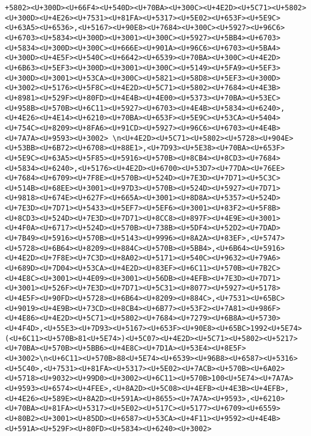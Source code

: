 \documentclass[
]{article}
\begin{document}
\begin{verbatim}
+5802><U+300D><U+66F4><U+540D><U+70BA><U+300C><U+4E2D><U+5C71><U+5802><U+300D><U+4E26><U+7531><U+81FA><U+5317><U+5E02><U+653F><U+5E9C><U+63A5><U+6536>,<U+5167><U+90E8><U+7684><U+300C><U+5927><U+96C6><U+6703><U+5834><U+300D><U+3001><U+300C><U+5927><U+5BB4><U+6703><U+5834><U+300D><U+300C><U+666E><U+901A><U+96C6><U+6703><U+5BA4><U+300D><U+4E5F><U+540C><U+6642><U+6539><U+70BA><U+300C><U+4E2D><U+6B63><U+5EF3><U+300D><U+3001><U+300C><U+5149><U+5FA9><U+5EF3><U+300D><U+3001><U+53CA><U+300C><U+5821><U+58D8><U+5EF3><U+300D><U+3002><U+5176><U+5F8C><U+4E2D><U+5C71><U+5802><U+7684><U+4E3B><U+8981><U+529F><U+80FD><U+4E4B><U+4E00><U+5373><U+70BA><U+53EC><U+958B><U+570B><U+6C11><U+5927><U+6703><U+4E4B><U+5834><U+6240>,<U+4E26><U+4E14><U+6210><U+70BA><U+653F><U+5E9C><U+53CA><U+5404><U+754C><U+8209><U+8FA6><U+91CD><U+5927><U+96C6><U+6703><U+4E4B><U+7A7A><U+9593><U+3002> \n<U+4E2D><U+5C71><U+5802><U+5728><U+904E><U+53BB><U+6B72><U+6708><U+88E1>,<U+7D93><U+5E38><U+70BA><U+653F><U+5E9C><U+63A5><U+5F85><U+5916><U+570B><U+8CB4><U+8CD3><U+7684><U+5834><U+6240>,<U+5176><U+4E2D><U+6700><U+53D7><U+77DA><U+76EE><U+7684><U+6709><U+7F8E><U+570B><U+524D><U+7E3D><U+7D71><U+5C3C><U+514B><U+68EE><U+3001><U+97D3><U+570B><U+524D><U+5927><U+7D71><U+9818><U+674E><U+627F><U+665A><U+3001><U+8D8A><U+5357><U+524D><U+7E3D><U+7D71><U+5433><U+5EF7><U+5EF6><U+3001><U+83F2><U+5F8B><U+8CD3><U+524D><U+7E3D><U+7D71><U+8CC8><U+897F><U+4E9E><U+3001><U+4F0A><U+6717><U+524D><U+570B><U+738B><U+5DF4><U+52D2><U+7DAD><U+7B49><U+5916><U+570B><U+5143><U+9996><U+8A2A><U+83EF>,<U+5747><U+5728><U+6B64><U+8209><U+884C><U+570B><U+5BB4>,<U+6B64><U+5916><U+4E2D><U+7F8E><U+7C3D><U+8A02><U+5171><U+540C><U+9632><U+79A6><U+689D><U+7D04><U+53CA><U+4E2D><U+83EF><U+6C11><U+570B><U+7B2C><U+4E8C><U+3001><U+4E09><U+3001><U+56DB><U+4EFB><U+7E3D><U+7D71><U+3001><U+526F><U+7E3D><U+7D71><U+5C31><U+8077><U+5927><U+5178><U+4E5F><U+90FD><U+5728><U+6B64><U+8209><U+884C>,<U+7531><U+65BC><U+9019><U+4E9B><U+73CD><U+8CB4><U+6B77><U+53F2><U+7A81><U+986F><U+4E86><U+4E2D><U+5C71><U+5802><U+7684><U+7279><U+6B8A><U+5730><U+4F4D>,<U+55E3><U+7D93><U+5167><U+653F><U+90E8><U+65BC>1992<U+5E74>(<U+6C11><U+570B>81<U+5E74>)<U+5C07><U+4E2D><U+5C71><U+5802><U+5217><U+70BA><U+570B><U+5BB6><U+4E8C><U+7D1A><U+53E4><U+8E5F><U+3002>\n<U+6C11><U+570B>88<U+5E74><U+6539><U+96B8><U+6587><U+5316><U+5C40>,<U+7531><U+81FA><U+5317><U+5E02><U+7ACB><U+570B><U+6A02><U+5718><U+9032><U+99D0><U+3002><U+6C11><U+570B>100<U+5E74><U+7A7A><U+9593><U+6574><U+4FEE>,<U+8A2D><U+5C08><U+4EFB><U+4E3B><U+4EFB>,<U+4E26><U+589E><U+8A2D><U+591A><U+8655><U+7A7A><U+9593>,<U+6210><U+70BA><U+81FA><U+5317><U+5E02><U+517C><U+5177><U+6709><U+6559><U+80B2><U+3001><U+85DD><U+6587><U+53CA><U+4F11><U+9592><U+4E4B><U+591A><U+529F><U+80FD><U+5834><U+6240><U+3002>

\end{verbatim}
\end{document}
